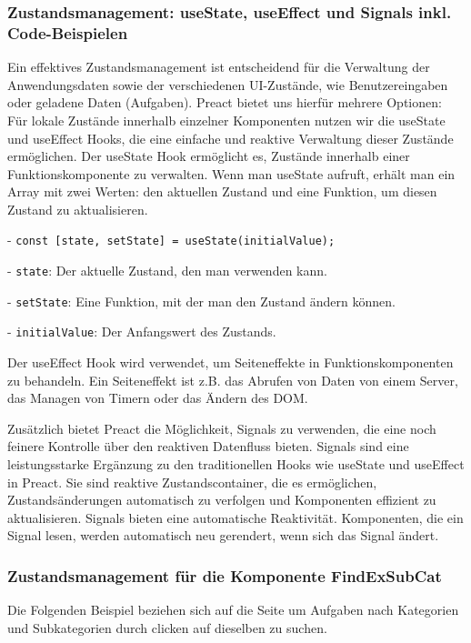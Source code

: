 \subsubsection{Zustandsmanagement: useState, useEffect und Signals inkl. Code-Beispielen}



Ein effektives Zustandsmanagement ist entscheidend für die Verwaltung der Anwendungsdaten sowie der verschiedenen UI-Zustände, wie Benutzereingaben oder geladene Daten (Aufgaben). Preact bietet uns hierfür mehrere Optionen: Für lokale Zustände innerhalb einzelner Komponenten nutzen wir die useState und useEffect Hooks, die eine einfache und reaktive Verwaltung dieser Zustände ermöglichen. 
Der useState Hook ermöglicht es, Zustände innerhalb einer Funktionskomponente zu verwalten. Wenn man useState aufruft, erhält man ein Array mit zwei Werten: den aktuellen Zustand und eine Funktion, um diesen Zustand zu aktualisieren.

- \texttt{const [state, setState] = useState(initialValue);}

- \texttt{state}: Der aktuelle Zustand, den man verwenden kann.

- \texttt{setState}: Eine Funktion, mit der man den Zustand ändern können.

- \texttt{initialValue}: Der Anfangswert des Zustands.

Der useEffect Hook wird verwendet, um Seiteneffekte in Funktionskomponenten zu behandeln. Ein Seiteneffekt ist z.B. das Abrufen von Daten von einem Server, das Managen von Timern oder das Ändern des DOM.

Zusätzlich bietet Preact die Möglichkeit, Signals zu verwenden, die eine noch feinere Kontrolle über den reaktiven Datenfluss bieten.
Signals sind eine leistungsstarke Ergänzung zu den traditionellen Hooks wie useState und useEffect in Preact. Sie sind reaktive Zustandscontainer, die es ermöglichen, Zustandsänderungen automatisch zu verfolgen und Komponenten effizient zu aktualisieren. Signals bieten eine automatische Reaktivität. Komponenten, die ein Signal lesen, werden automatisch neu gerendert, wenn sich das Signal ändert.


\subsubsection{Zustandsmanagement für die Komponente FindExSubCat } 
Die Folgenden Beispiel beziehen sich auf die Seite um Aufgaben nach Kategorien und Subkategorien durch clicken auf dieselben zu suchen.

